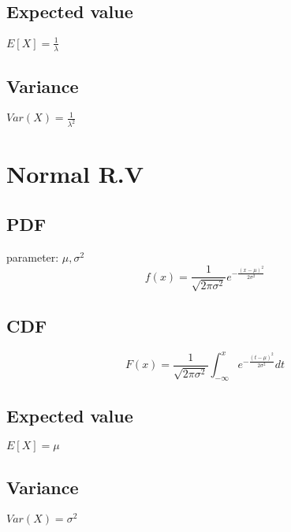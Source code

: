     \subsection*{Expected value}
        $E[X] = \frac{1}{\lambda}$

    \subsection*{Variance}
        $Var(X)=\frac{1}{\lambda^2}$

\section{Normal R.V}
    \subsection*{PDF}
        parameter: $\mu, \sigma^2$
        \begin{equation*}
            f(x)=\frac{1}{\sqrt{2\pi\sigma^2}}e^{-\frac{(x-\mu)^2}{2\sigma^2}}
        \end{equation*}

    \subsection*{CDF}
        \begin{equation*}
            F(x)=\frac{1}{\sqrt{2\pi\sigma^2}}\int_{-\infty}^{x} e^{-\frac{(t-\mu)^2}{2\sigma^2}} dt
        \end{equation*}

    \subsection*{Expected value}
        $E[X] = \mu$

    \subsection*{Variance}
        $Var(X)=\sigma^2$


    
